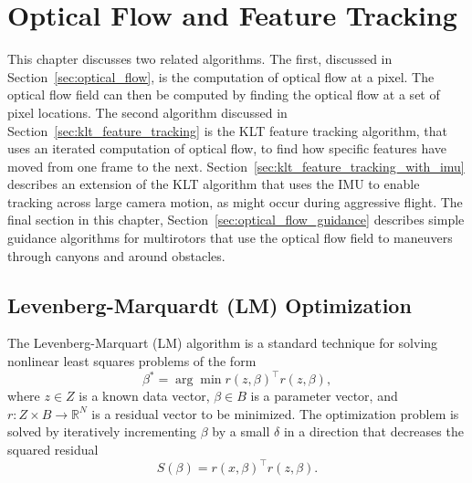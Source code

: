 
\chapter{Optical Flow and Feature Tracking}
\label{chap:optical_flow}

This chapter discusses two related algorithms.  The first, discussed in Section~\ref{sec:optical_flow}, is the computation of optical flow at a pixel.  The optical flow field can then be computed by finding the optical flow at a set of pixel locations.  The second algorithm discussed in Section~\ref{sec:klt_feature_tracking} is the KLT feature tracking algorithm, that uses an iterated computation of optical flow, to find how specific features have moved from one frame to the next.  Section~\ref{sec:klt_feature_tracking_with_imu} describes an extension of the KLT algorithm that uses the IMU to enable tracking across large camera motion, as might occur during aggressive flight.  The final section in this chapter, Section~\ref{sec:optical_flow_guidance} describes simple guidance algorithms for multirotors that use the optical flow field to maneuvers through canyons and around obstacles.

\section{Levenberg-Marquardt (LM) Optimization}
\label{sec:LM_optimization}


The Levenberg-Marquart (LM) algorithm is a standard technique for solving nonlinear least squares problems of the form
\[
\beta^\ast = \arg\min r(z, \beta)^\top r(z, \beta),
\]
where $z\in Z$ is a known data vector, $\beta \in B$ is a parameter vector, and $r:Z\times B\to \mathbb{R}^N$ is a residual vector to be minimized.  
The optimization problem is solved by iteratively incrementing $\beta$ by a small $\delta$ in a direction that decreases the squared residual
\[
S(\beta) = r(x, \beta)^\top r(z, \beta).
\]

